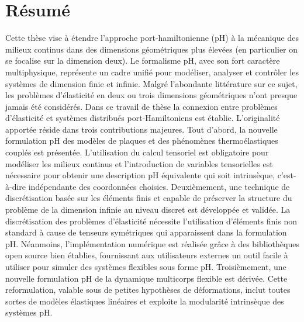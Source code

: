 \chapter*{R\'esum\'e}

Cette thèse vise à étendre l'approche port-hamiltonienne (pH) à la mécanique des milieux continus dans des dimensions géométriques plus élevées (en particulier on se focalise sur la dimension deux). Le formalisme pH, avec son fort caractère multiphysique, représente un cadre unifié pour modéliser, analyser et contrôler les systèmes de dimension finie et infinie. Malgré l'abondante littérature sur ce sujet, les problèmes d'élasticité en deux ou trois dimensions géométriques n'ont presque jamais été considérés. Dans ce travail de thèse la connexion entre problèmes d'élasticité et systèmes distribués port-Hamiltoniens est établie. L'originalité apportée réside dans trois contributions majeures. Tout d'abord, la nouvelle formulation pH des modèles de plaques et des phénomènes thermoélastiques couplés est présentée. L'utilisation du calcul tensoriel est obligatoire pour modéliser les milieux  continus et l'introduction de variables tensorielles est nécessaire pour obtenir une description pH équivalente qui soit intrinsèque, c'est-à-dire indépendante des coordonnées choisies. Deuxièmement, une technique de discrétisation basée sur les éléments finis et capable de préserver la structure du problème de la dimension infinie au niveau discret est développée et validée. La discrétisation des problèmes d'élasticité nécessite l'utilisation d'éléments finis non standard à cause de tenseurs symétriques qui apparaissent dans la formulation pH. Néanmoins, l'implémentation numérique est réalisée grâce à des bibliothèques open source bien établies, fournissant aux utilisateurs externes un outil facile à utiliser pour simuler des systèmes flexibles sous forme pH. Troisièmement, une nouvelle formulation pH de la dynamique multicorps flexible est dérivée. Cette reformulation, valable sous de petites hypothèses de déformations, inclut toutes sortes de modèles élastiques linéaires et exploite la modularité intrinsèque des systèmes pH.
